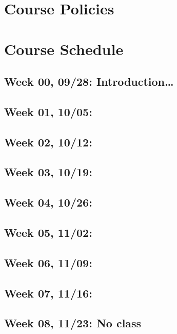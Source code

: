 \documentclass[11pt,]{article}
\begin{document}
\section{Course Policies}\label{course-policies}

\section{Course Schedule}\label{course-schedule}

\subsection{Week 00, 09/28:
Introduction\ldots{}}\label{week-00-0928-introduction}

\subsection{Week 01, 10/05:}\label{week-01-1005}

\subsection{Week 02, 10/12:}\label{week-02-1012}

\subsection{Week 03, 10/19:}\label{week-03-1019}

\subsection{Week 04, 10/26:}\label{week-04-1026}

\subsection{Week 05, 11/02:}\label{week-05-1102}

\subsection{Week 06, 11/09:}\label{week-06-1109}

\subsection{Week 07, 11/16:}\label{week-07-1116}

\subsection{Week 08, 11/23: No class}\label{week-08-1123-no-class}
\end{document}

